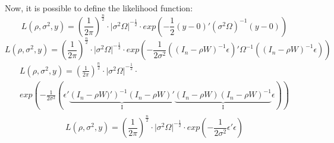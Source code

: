 \documentclass[12pt,onecolumn]{article}
\begin{document}
\begin{enumerate}
\begin{enumerate}
        Now, it is possible to define the likelihood function:
        \begin{equation*}
            L(\rho,\sigma^2,y)=\left(\frac{1}{2\pi}\right)^\frac{n}{2}\cdot{\lvert{\sigma^2\Omega\rvert}^{-\frac{1}{2}}}\cdot{exp\left({-\frac{1}{2}}{\left(y-0\right)'}{\left(\sigma^2\Omega\right)^{-1}}{\left(y-0\right)}\right)}
        \end{equation*}
        \begin{equation*}
            L(\rho,\sigma^2,y)=\left(\frac{1}{2\pi}\right)^\frac{n}{2}\cdot{\lvert{\sigma^2\Omega\rvert}^{-\frac{1}{2}}}\cdot{exp\left({-\frac{1}{2\sigma^2}}{\left((I_n-\rho{W})^{-1}\epsilon\right)'}{\Omega^{-1}}{\left((I_n-\rho{W})^{-1}\epsilon\right)}\right)} 
        \end{equation*}
        \begin{equation*}
            \begin{split}
                L(\rho,\sigma^2,y)=\left(\frac{1}{2\pi}\right)^\frac{n}{2}\cdot{\lvert{\sigma^2\Omega\rvert}^{-\frac{1}{2}}}\cdot\\
                {exp\left({-\frac{1}{2\sigma^2}}\left(\epsilon'\underbrace{\left(I_n-\rho{W})'\right)^{-1}(I_n-\rho{W})'}_\text{I}\underbrace{(I_n-\rho{W})(I_n-\rho{W})^{-1}}_\text{I}\epsilon\right)\right)} \\
            \end{split}
        \end{equation*}
        \begin{equation*}
            L(\rho,\sigma^2,y)=\left(\frac{1}{2\pi}\right)^\frac{n}{2}\cdot{\lvert{\sigma^2\Omega\rvert}^{-\frac{1}{2}}}\cdot{exp\left({-\frac{1}{2\sigma^2}}\epsilon'\epsilon\right)}
        \end{equation*}
        

\end{enumerate}
\end{enumerate}
\end{document}
